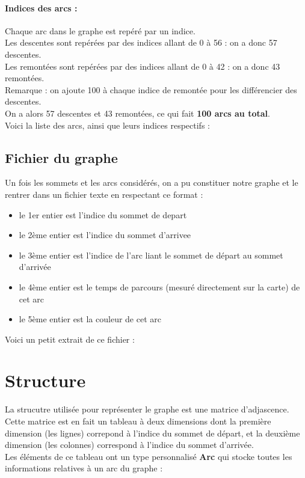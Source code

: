 \documentclass[a4]{article}
\begin{document}
			\paragraph{Indices des arcs :\\}
			Chaque arc dans le graphe est repéré par un indice.\\
			Les descentes sont repérées par des indices allant de 0 à 56 : on a donc 57 descentes.\\
			Les remontées sont repérées par des indices allant de 0 à 42 : on a donc 43 remontées.\\
			Remarque : on ajoute 100 à chaque indice de remontée pour les différencier des descentes.\\
			On a alors 57 descentes et 43 remontées, ce qui fait \textbf{100 arcs au total}.\\
			Voici la liste des arcs, ainsi que leurs indices respectifs :
			
		
		\subsection{Fichier du graphe}
			Un fois les sommets et les arcs considérés, on a pu constituer notre graphe et le rentrer dans un fichier texte en respectant ce format :
			\begin{itemize}
			\item{le 1er entier est l'indice du sommet de depart}
			\item{le 2ème entier est l'indice du sommet d'arrivee}
			\item{le 3ème entier est l'indice de l'arc liant le sommet de départ au sommet d'arrivée}
			\item{le 4ème entier est le temps de parcours (mesuré directement sur la carte) de cet arc}
			\item{le 5ème entier est la couleur de cet arc}
			\end{itemize}
			Voici un petit extrait de ce fichier :
			
			
	\section{Structure}
			La strucutre utilisée pour représenter le graphe est une matrice d'adjascence. Cette matrice est en fait un tableau à deux dimensions 
			dont la première dimension (les lignes) correpond à l'indice du sommet de départ, et la deuxième dimension (les colonnes) correspond 
			à l'indice du sommet d'arrivée.\\
			Les éléments de ce tableau ont un type personnalisé \textbf{Arc} qui stocke toutes les informations relatives à un arc du graphe :
			
			
\end{document}
